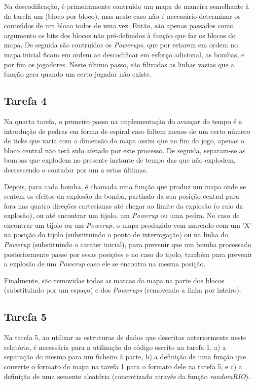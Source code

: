 \documentclass[a4paper]{report}
\begin{document}
Na descodificação, é primeiramente contruído um mapa de maneira semelhante à da tarefa um (bloco por bloco), mas neste caso não é necessário determinar os conteúdos de um bloco todos de uma vez. Então, são apenas passados como argumento os bits dos blocos não pré-definidos à função que faz os blocos do mapa. De seguida são contruídos os \textit{Powerups}, que por estarem em ordem no mapa inicial ficam em ordem ao descodificar em esforço adicional, as bombas, e por fim os jogadores. Neste último passo, são filtradas as linhas vazias que a função gera quando um certo jogador não existe.

\subsection{Tarefa 4}
Na quarta tarefa, o primeiro passo na implementação do avançar do tempo é a introdução de pedras em forma de espiral caso faltem menos de um certo número de ticks que varia com a dimensão do mapa assim que no fim do jogo, apenas o bloco central não terá sido afetado por este processo. De seguida, separam-se as bombas que explodem no presente instante de tempo das que não explodem, decrescendo o contador por um a estas últimas.

Depois, para cada bomba, é chamada uma função que produz um mapa onde se sentem os efeitos da explosão da bomba, partindo da sua posição central para fora nas quatro direções cartesianas até chegar ao limite da explosão (o raio da explosão), ou até encontrar um tijolo, um \textit{Powerup} ou uma pedra. No caso de encontrar um tijolo ou um \textit{Powerup}, o mapa produzido vem marcado com um 'X' na posição do tijolo (substituindo o ponto de interrogação) ou na linha do \textit{Powerup} (substituindo o carater inicial), para prevenir que um bomba processado posteriormente passe por essas posições e no caso do tijolo, também para prevenir a explosão de um \textit{Powerup} caso ele se encontra na mesma posição.

Finalmente, são removidas todas as marcas do mapa na parte dos blocos (substituindo por um espaço) e dos \textit{Powerups} (removendo a linha por inteiro).

\subsection{Tarefa 5}
Na tarefa 5, ao utilizar as estruturas de dados que descritas anteriormente neste relatório, é necessária para a utilização do código escrito na tarefa 1, a) a separação do mesmo para um ficheiro à parte, b) a definição de uma função que converte o formato do mapa na tarefa 1 para o formato dele na tarefa 5, e c) a definição de uma semente aleatória (concretizado através da função \textit{randomRIO}).
\end{document}
